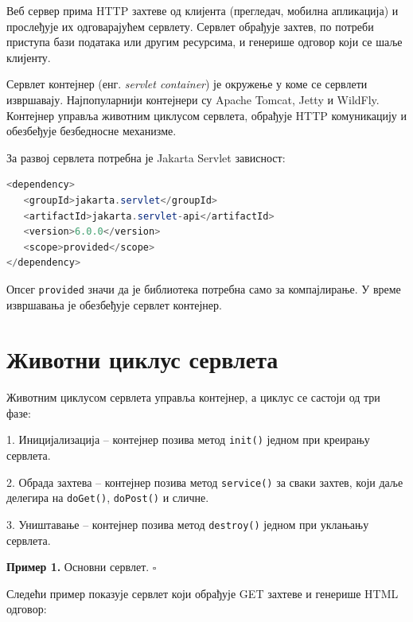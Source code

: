 Веб сервер прима HTTP захтеве од клијента (прегледач, мобилна апликација) и прослеђује их одговарајућем сервлету. Сервлет обрађује захтев, по потреби приступа бази података или другим ресурсима, и генерише одговор који се шаље клијенту.

Сервлет контејнер (енг. \textit{servlet container}) је окружење у коме се сервлети извршавају. Најпопуларнији контејнери су Apache Tomcat, Jetty и WildFly. Контејнер управља животним циклусом сервлета, обрађује HTTP комуникацију и обезбеђује безбедносне механизме.

За развој сервлета потребна је Jakarta Servlet зависност:


\begin{lstlisting}[language=Java]
<dependency>
   <groupId>jakarta.servlet</groupId>
   <artifactId>jakarta.servlet-api</artifactId>
   <version>6.0.0</version>
   <scope>provided</scope>
</dependency>
\end{lstlisting}


Опсег \texttt{provided} значи да је библиотека потребна само за компајлирање. У време извршавања је обезбеђује сервлет контејнер.


\section{Животни циклус сервлета}

Животним циклусом сервлета управља контејнер, а циклус се састоји од три фазе:

1. Иницијализација – контејнер позива метод \texttt{init()} једном при креирању сервлета.

2. Обрада захтева – контејнер позива метод \texttt{service()} за сваки захтев, који даље делегира на \texttt{doGet()}, \texttt{doPost()} и сличне.

3. Уништавање – контејнер позива метод \texttt{destroy()} једном при уклањању сервлета.


\bigskip

\noindent \textbf{Пример 1.} Основни сервлет. $\square$

\medskip

Следећи пример показује сервлет који обрађује GET захтеве и генерише HTML одговор:


